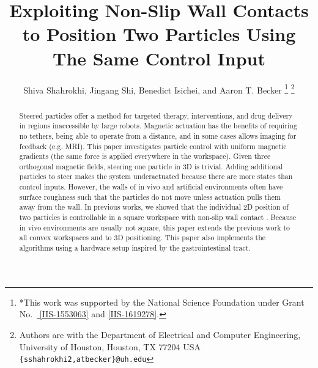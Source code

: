 \documentclass[letterpaper, 10 pt, conference]{ieeeconf}
\title{\LARGE \bf Exploiting Non-Slip Wall Contacts \\  to Position Two Particles Using The Same Control Input}
\author{Shiva Shahrokhi, Jingang Shi,  Benedict Isichei, and Aaron T. Becker%
\thanks{*This work was supported by the National Science Foundation under Grant No.\ \href{http://nsf.gov/awardsearch/showAward?AWD_ID=1553063}{ [IIS-1553063]} and \href{http://nsf.gov/awardsearch/showAward?AWD_ID=1619278}{[IIS-1619278]}.}%
\thanks{Authors are with the Department of Electrical and Computer Engineering,  University of Houston, Houston, TX 77204 USA        {\tt\small  \{sshahrokhi2,atbecker\}@uh.edu}}%
}
\begin{document}
\maketitle
\thispagestyle{empty}
\pagestyle{empty}


\begin{abstract}


Steered particles offer a method for targeted therapy, interventions, and drug delivery in regions inaccessible by large robots.
Magnetic actuation has the benefits of requiring no tethers, being able to operate from a distance, and in some cases allows imaging for feedback (e.g. MRI).
 This paper investigates particle control with uniform magnetic gradients (the same force is applied everywhere in the workspace).
Given three orthogonal magnetic fields, steering one particle in 3D is trivial. 
Adding additional particles to steer makes the system underactuated because there are more states than control inputs. 
However, the walls of in vivo and artificial environments often have surface roughness such that the particles do not move unless actuation pulls them away from the wall.
In previous works, we showed that the individual 2D position of two particles is controllable in a square workspace with non-slip wall contact \cite{shahrokhi2017algorithms}.
Because in vivo environments are usually not square, this paper extends the previous work to all convex workspaces and to 3D positioning. 
This paper also implements the algorithms using a hardware setup inspired by the gastrointestinal tract.





\end{abstract}
\end{document}
